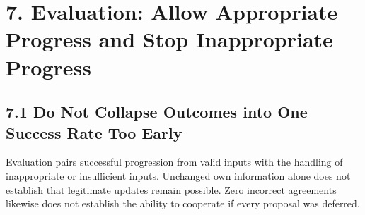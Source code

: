 \documentclass[10pt,a4paper]{article}
\begin{document}
\section{7. Evaluation: Allow Appropriate Progress and Stop Inappropriate Progress}\label{two-role-failure-design-evaluation-allow-appropriate-progress-and-stop-inappropriate-progress}

\subsection{7.1 Do Not Collapse Outcomes into One Success Rate Too Early}\label{two-role-failure-design-do-not-collapse-outcomes-into-one-success-rate-too-early}

Evaluation pairs successful progression from valid inputs with the handling of inappropriate or insufficient inputs. Unchanged own information alone does not establish that legitimate updates remain possible. Zero incorrect agreements likewise does not establish the ability to cooperate if every proposal was deferred.
\end{document}
